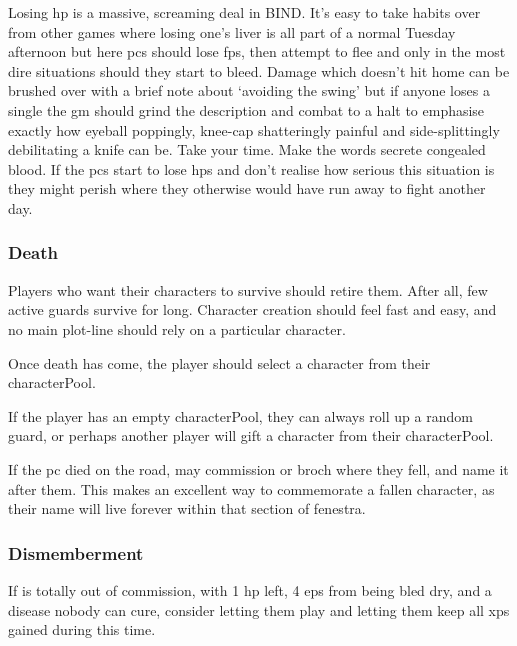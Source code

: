 \begin{multicols}{2}
Losing \gls{hp} is a massive, screaming deal in BIND.
It's easy to take habits over from other games where losing one's liver is all part of a normal Tuesday afternoon but here \glspl{pc} should lose \glspl{fp}, then attempt to flee and only in the most dire situations should they start to bleed.
Damage which doesn't hit home can be brushed over with a brief note about `avoiding the swing' but if anyone loses a single  the \gls{gm} should grind the description and combat to a halt to emphasise exactly how eyeball poppingly, knee-cap shatteringly painful and side-splittingly debilitating a knife can be.
Take your time.
Make the words secrete congealed blood.
If the \glspl{pc} start to lose \glspl{hp} and don't realise how serious this situation is they might perish where they otherwise would have run away to fight another day.

\subsubsection{Death}
\label{pcdeath}

Players who want their characters to survive should retire them.
After all, few active \glspl{guard} survive for long.
Character creation should feel fast and easy, and no main plot-line should rely on a particular character.

Once death has come, the player should select a character from
their \gls{characterPool}.

If the player has an empty \gls{characterPool}, they can always roll up a random \gls{guard}, or perhaps another player will gift a character from their \gls{characterPool}.

If the \gls{pc} died on the road,  may commission  or \gls{broch} where they fell, and name it after them.
This makes an excellent way to commemorate a fallen character, as their name will live forever within that section of \gls{fenestra}.

\subsubsection{Dismemberment}

If  is totally out of commission, with 1 \gls{hp} left, 4 \glspl{ep} from being bled dry, and a disease nobody can cure, consider letting them play  and letting them keep all \glspl{xp} gained during this time.

\end{multicols}


